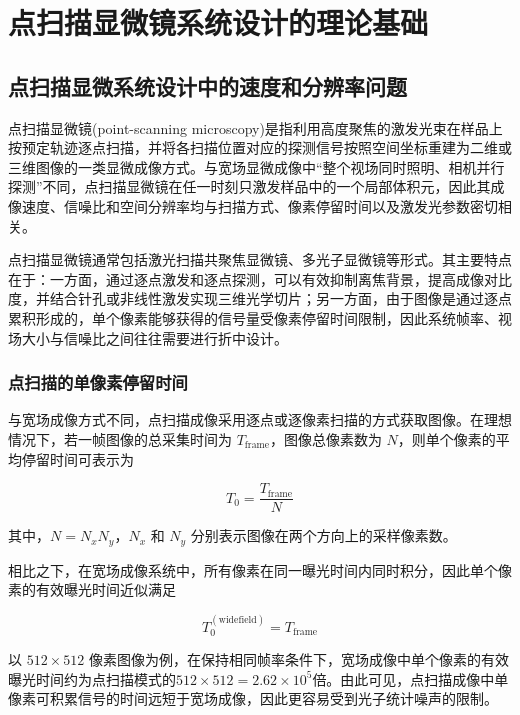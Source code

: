 \chapter{点扫描显微镜系统设计的理论基础}\label{chap:2}
\section{点扫描显微系统设计中的速度和分辨率问题}\label{2.1}
点扫描显微镜(point-scanning microscopy)是指利用高度聚焦的激发光束在样品上按预定轨迹逐点扫描，并将各扫描位置对应的探测信号按照空间坐标重建为二维或三维图像的一类显微成像方式。与宽场显微成像中``整个视场同时照明、相机并行探测''不同，点扫描显微镜在任一时刻只激发样品中的一个局部体积元，因此其成像速度、信噪比和空间分辨率均与扫描方式、像素停留时间以及激发光参数密切相关。

点扫描显微镜通常包括激光扫描共聚焦显微镜、多光子显微镜等形式。其主要特点在于：一方面，通过逐点激发和逐点探测，可以有效抑制离焦背景，提高成像对比度，并结合针孔或非线性激发实现三维光学切片；另一方面，由于图像是通过逐点累积形成的，单个像素能够获得的信号量受像素停留时间限制，因此系统帧率、视场大小与信噪比之间往往需要进行折中设计。

\subsection{点扫描的单像素停留时间}\label{2.1.1}
与宽场成像方式不同，点扫描成像采用逐点或逐像素扫描的方式获取图像。在理想情况下，若一帧图像的总采集时间为 $T_{\mathrm{frame}}$，图像总像素数为 $N$，则单个像素的平均停留时间可表示为

\begin{equation}
T_0=\frac{T_{\mathrm{frame}}}{N}
\label{eq:dwell_time_basic}
\end{equation}

其中，$N=N_xN_y$，$N_x$ 和 $N_y$ 分别表示图像在两个方向上的采样像素数。

相比之下，在宽场成像系统中，所有像素在同一曝光时间内同时积分，因此单个像素的有效曝光时间近似满足

\begin{equation}
T_0^{(\mathrm{widefield})}=T_{\mathrm{frame}}
\label{eq:widefield_exposure}
\end{equation}

以 $512\times512$ 像素图像为例，在保持相同帧率条件下，宽场成像中单个像素的有效曝光时间约为点扫描模式的$512\times512=2.62\times10^{5}$倍。由此可见，点扫描成像中单像素可积累信号的时间远短于宽场成像，因此更容易受到光子统计噪声的限制。

